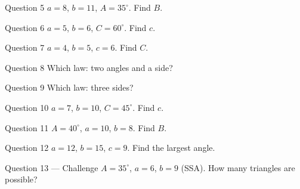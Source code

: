 \documentclass[11pt]{article}
\begin{document}
\begin{qbox}{Question 5}
$a=8$, $b=11$, $A=35^\circ$. Find $B$.\workspace{3cm}
\end{qbox}

\begin{qbox}{Question 6}
$a=5$, $b=6$, $C=60^\circ$. Find $c$.\workspace{3cm}
\end{qbox}

\begin{qbox}{Question 7}
$a=4$, $b=5$, $c=6$. Find $C$.\workspace{3cm}
\end{qbox}

\begin{qbox}{Question 8}
Which law: two angles and a side?\workspace{2.4cm}
\end{qbox}

\begin{qbox}{Question 9}
Which law: three sides?\workspace{2.4cm}
\end{qbox}

\begin{qbox}{Question 10}
$a=7$, $b=10$, $C=45^\circ$. Find $c$.\workspace{3cm}
\end{qbox}

\begin{qbox}{Question 11}
$A=40^\circ$, $a=10$, $b=8$. Find $B$.\workspace{3cm}
\end{qbox}

\begin{qbox}{Question 12}
$a=12$, $b=15$, $c=9$. Find the largest angle.\workspace{3cm}
\end{qbox}

\begin{qbox}{Question 13 --- Challenge}
$A=35^\circ$, $a=6$, $b=9$ (SSA). How many triangles are possible?\workspace{3cm}
\end{qbox}

\clearpage
{}
\end{document}
